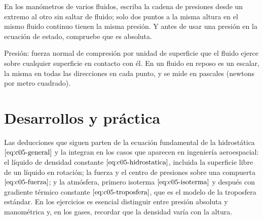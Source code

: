 \documentclass[10pt,openany]{book}
\begin{document}
\begin{tcolorbox}[title={Consejo}, studiumtip, breakable]

En los manómetros de varios fluidos, escriba la cadena de presiones desde un extremo al otro sin saltar de fluido; solo dos puntos a la misma altura en el mismo fluido continuo tienen la misma presión. Y antes de usar una presión en la ecuación de estado, compruebe que es absoluta.
\end{tcolorbox}

\begin{tcolorbox}[title={Definición}, studiumdef, breakable]

Presión: fuerza normal de compresión por unidad de superficie que el fluido ejerce sobre cualquier superficie en contacto con él. En un fluido en reposo es un escalar, la misma en todas las direcciones en cada punto, y se mide en pascales (newtons por metro cuadrado).
\end{tcolorbox}





\section{Desarrollos y práctica}

Las deducciones que siguen parten de la ecuación fundamental de la hidrostática \(\eqref{eq:c05-general}\) y la integran en los casos que aparecen en ingeniería aeroespacial: el líquido de densidad constante \(\eqref{eq:c05-hidrostatica}\), incluida la superficie libre de un líquido en rotación; la fuerza y el centro de presiones sobre una compuerta \(\eqref{eq:c05-fuerza}\); y la atmósfera, primero isoterma \(\eqref{eq:c05-isoterma}\) y después con gradiente térmico constante \(\eqref{eq:c05-troposfera}\), que es el modelo de la troposfera estándar. En los ejercicios es esencial distinguir entre presión absoluta y manométrica y, en los gases, recordar que la densidad varía con la altura.
\end{document}
